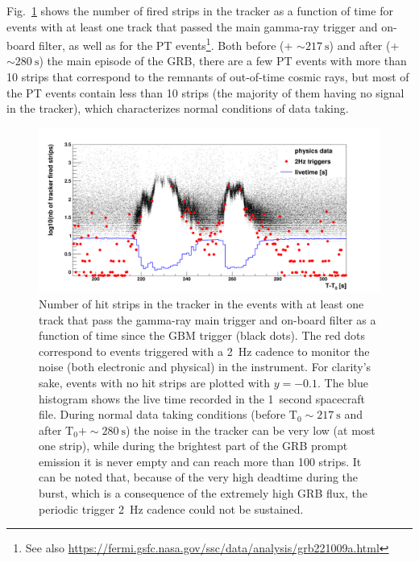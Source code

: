 \documentclass[preprint]{aastex631}
\begin{document}
Fig.~\ref{fig:bti_fssc} shows the number of fired strips in the tracker as a function of time for events with at least one track that passed the main gamma-ray trigger and on-board filter, as well as for the PT events\footnote{See also \url{https://fermi.gsfc.nasa.gov/ssc/data/analysis/grb221009a.html}}. 
Both before (\trig + $\sim 217~\mathrm{s}$) and after (\trig + $\sim 280~\mathrm{s}$) the main episode of the GRB, there are a few PT events with more than 10 strips that correspond to the remnants of out-of-time cosmic rays, but most of the PT events contain less than 10 strips (the majority of them having no signal in the tracker), which characterizes normal conditions of data taking.
\begin{figure}[t]
    \centering    
    \includegraphics[width=0.9\linewidth]{showvar2_GRB221009A_log10_TkrNumStrips__nbin120_optperiodictrigger-0p1.png}
    \caption{Number of hit strips in the tracker in the events with at least one track that pass the gamma-ray main trigger and on-board filter as a function of time since the GBM trigger (black dots). The red dots correspond to events triggered with a 2~Hz cadence to monitor the noise (both electronic and physical) in the instrument. For clarity's sake, events with no hit strips are plotted with $y=-0.1$. The blue histogram shows the live time recorded in the 1~second spacecraft file. During normal data taking conditions (before $\mathrm{T}_0 \sim 217~\mathrm{s}$ and after $\mathrm{T}_0 + \sim 280~\mathrm{s}$) the noise in the tracker can be very low (at most one strip), while during the brightest part of the GRB prompt emission it is never empty and can reach more than 100 strips. It can be noted that, because of the very high deadtime during the burst, which is a consequence of the extremely high GRB flux, the periodic trigger 2~Hz cadence could not be sustained.}
    \label{fig:bti_fssc}
\end{figure}
\end{document}
